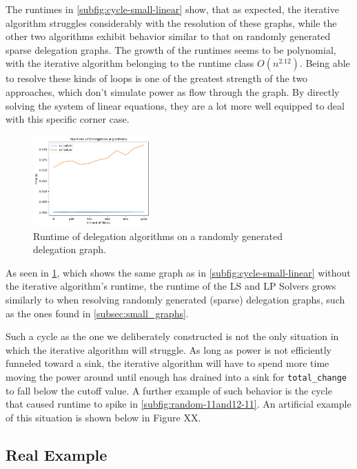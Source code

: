 The runtimes in \cref{subfig:cycle-small-linear} show, that as expected, the iterative algorithm struggles considerably with the resolution of these graphs, while the other two algorithms exhibit behavior similar to that on randomly generated sparse delegation graphs. The growth of the runtimes seems to be polynomial, with the iterative algorithm belonging to the runtime class $O(n^{2.12})$. Being able to resolve these kinds of loops is one of the greatest strength of the two approaches, which don't simulate power as flow through the graph. By directly solving the system of linear equations, they are a lot more well equipped to deal with this specific corner case.  

\begin{figure}[t]
	\centering
    	\includegraphics[width=0.4\textwidth]{0-1000_cycle_no_iterative}
    	\caption{Runtime of delegation algorithms on a randomly generated delegation graph.}
	\label{fig:cycle-small-no-iterative-linear}
\end{figure}

As seen in \cref{fig:cycle-small-no-iterative-linear}, which shows the same graph as in \cref{subfig:cycle-small-linear} without the iterative algorithm's runtime, the runtime of the LS and LP Solvers grows similarly to when resolving randomly generated (sparse) delegation graphs, such as the ones found in \cref{subsec:small_graphs}.

Such a cycle as the one we deliberately constructed is not the only situation in which the iterative algorithm will struggle. As long as power is not efficiently funneled toward a sink, the iterative algorithm will have to spend more time moving the power around until enough has drained into a sink for \texttt{total\_change} to fall below the cutoff value. A further example of such behavior is the cycle that caused runtime to spike in \cref{subfig:random-11and12-11}. An artificial example of this situation is shown below in Figure XX. 


\subsection{Real Example}

